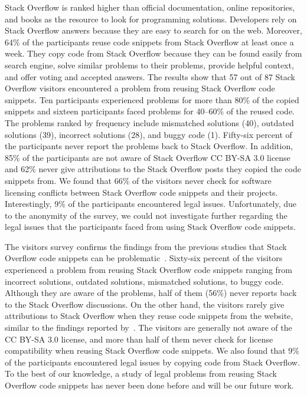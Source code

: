 \documentclass[a4paper,twoside,10pt]{reviewresponse}
\begin{document}
Stack Overflow is ranked higher than official documentation, online
repositories, and books as the resource to look for programming solutions.
Developers rely on Stack Overflow answers because they are easy to search for on
the web. Moreover, 64\% of the participants reuse code snippets from Stack
Overflow at least once a week. They copy code from Stack Overflow because they
can be found easily from search engine, solve similar problems to their
problems, provide helpful context, and offer voting and accepted answers. The
results show that 57 out of 87 Stack Overflow visitors encountered a problem
from reusing Stack Overflow code snippets. Ten participants experienced problems
for more than 80\% of the copied snippets and sixteen participants faced
problems for 40--60\% of the reused code. The problems ranked by frequency
include mismatched solutions (40), outdated solutions (39), incorrect solutions
(28), and buggy code (1). Fifty-six percent of the participants never report the
problems back to Stack Overflow. In addition, 85\% of the participants are not
aware of Stack Overflow CC BY-SA 3.0 license and 62\% never give attributions to
the Stack Overflow posts they copied the code snippets from. We found that 66\%
of the visitors never check for software licensing conflicts between Stack
Overflow code snippets and their projects. Interestingly, 9\% of the
participants encountered legal issues. Unfortunately, due to the anonymity of
the survey, we could not investigate further regarding the legal issues that the
participants faced from using Stack Overflow code snippets.

The visitors survey confirms the findings from the previous studies that Stack
Overflow code snippets can be problematic~\citep{Zhang2018,Acar2016,An2017}. Sixty-six
percent of the visitors experienced a problem from reusing Stack Overflow code
snippets ranging from incorrect solutions, outdated solutions, mismatched
solutions, to buggy code. Although they are aware of the problems, half of them
(56\%) never reports back to the Stack Overflow discussions. On the other hand,
the visitors rarely give attributions to Stack Overflow when they reuse code
snippets from the website, similar to the findings reported
by~\cite{Baltes2017}. The visitors are generally not aware of the CC BY-SA 3.0
license, and more than half of them never check for license compatibility when
reusing Stack Overflow code snippets. We also found that 9\% of the participants
encountered legal issues by copying code from Stack Overflow. To the best of our
knowledge, a study of legal problems from reusing Stack Overflow code snippets
has never been done before and will be our future work.
\end{document}
